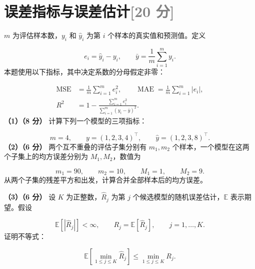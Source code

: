 \documentclass[11pt,a4paper]{article}
\begin{document}
\par\addvspace{1.2em}\noindent\begin{minipage}{\linewidth}
\section[误差指标与误差估计（20 分）]{误差指标与误差估计\hfill\textcolor{gray}{[20 分]}}
$m$ 为评估样本数，$y_i$ 和 $\widehat y_i$ 为第 $i$ 个样本的真实值和预测值。定义


\[
e_i=\widehat y_i-y_i,\qquad \bar y=\frac1m\sum_{i=1}^my_i.
\]
本题使用以下指标，其中决定系数的分母假定非零：


\[
\begin{aligned}
\operatorname{MSE}&=\frac1m\sum_{i=1}^me_i^2,\qquad
\operatorname{MAE}=\frac1m\sum_{i=1}^m|e_i|,\\
R^2&=1-\frac{\sum_{i=1}^me_i^2}{\sum_{i=1}^m(y_i-\bar y)^2}.
\end{aligned}
\]
\textbf{（1）（8 分）} 计算下列一个模型的三项指标：


\[
m=4,\qquad y=(1,2,3,4)^\top,\qquad
\widehat y=(1,2,3,8)^\top.
\]
\textbf{（2）（6 分）} 两个互不重叠的评估子集分别有 $m_1,m_2$ 个样本，一个模型在这两个子集上的均方误差分别为 $M_1,M_2$，数值为


\[
m_1=90,\qquad m_2=10,\qquad M_1=1,\qquad M_2=9.
\]
从两个子集的残差平方和出发，计算合并全部样本后的均方误差。

\textbf{（3）（6 分）} 设 $K$ 为正整数，$\widehat R_j$ 为第 $j$ 个候选模型的随机误差估计，$\mathbb E$ 表示期望。假设


\[
\mathbb E[|\widehat R_j|]<\infty,\qquad
R_j=\mathbb E[\widehat R_j],\qquad j=1,\ldots,K.
\]
证明不等式：


\[
\mathbb E\left[\min_{1\leq j\leq K}\widehat R_j\right]
\leq\min_{1\leq j\leq K}R_j.
\]

\end{minipage}\par
\end{document}
